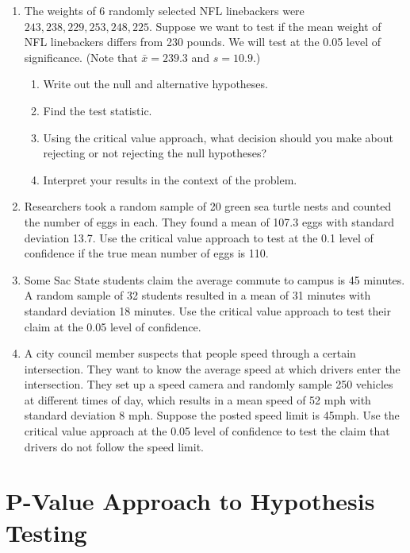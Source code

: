 \documentclass[
]{book}
\providecommand{\tightlist}{%
  \setlength{\itemsep}{0pt}\setlength{\parskip}{0pt}}
\begin{document}
\begin{enumerate}
\def\labelenumi{\arabic{enumi}.}
\tightlist
\item
  The weights of 6 randomly selected NFL linebackers were \(243, 238, 229, 253, 248, 225\). Suppose we want to test if the mean weight of NFL linebackers differs from 230 pounds. We will test at the 0.05 level of significance. (Note that \(\bar{x} = 239.3\) and \(s = 10.9\).)

  \begin{enumerate}
  \def\labelenumii{\alph{enumii}.}
  \tightlist
  \item
    Write out the null and alternative hypotheses.
  \item
    Find the test statistic.
  \item
    Using the critical value approach, what decision should you make about rejecting or not rejecting the null hypotheses?
  \item
    Interpret your results in the context of the problem.
  \end{enumerate}
\item
  Researchers took a random sample of 20 green sea turtle nests and counted the number of eggs in each. They found a mean of 107.3 eggs with standard deviation 13.7. Use the critical value approach to test at the 0.1 level of confidence if the true mean number of eggs is 110.
\item
  Some Sac State students claim the average commute to campus is 45 minutes. A random sample of 32 students resulted in a mean of 31 minutes with standard deviation 18 minutes. Use the critical value approach to test their claim at the 0.05 level of confidence.
\item
  A city council member suspects that people speed through a certain intersection. They want to know the average speed at which drivers enter the intersection. They set up a speed camera and randomly sample 250 vehicles at different times of day, which results in a mean speed of 52 mph with standard deviation 8 mph. Suppose the posted speed limit is 45mph. Use the critical value approach at the 0.05 level of confidence to test the claim that drivers do not follow the speed limit.
\end{enumerate}

\section{P-Value Approach to Hypothesis Testing}\label{p-value-approach-to-hypothesis-testing}
\end{document}

